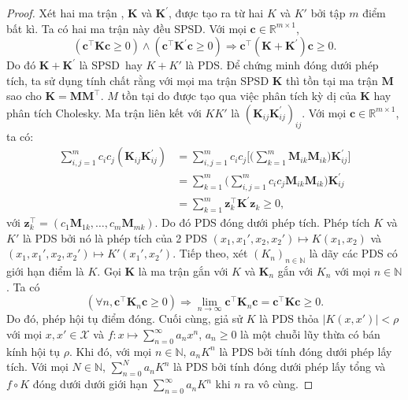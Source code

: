\begin{proof}
  Xét hai ma trận , $\mathbf{K}$ và $\mathbf{K}^\prime$, được tạo ra
  từ hai  $K$ và $K'$ bởi tập $m$ điểm bất kì. Ta có hai ma trận này
  đều SPSD. Với mọi $\mathbf{c} \in \mathbb{R}^{m\times 1}$, \begin{equation}
    (\mathbf{c}^\intercal \mathbf{K} \mathbf{c} \ge 0) \wedge
    (\mathbf{c}^\intercal \mathbf{K}^\prime \mathbf{c} \ge 0) \Rightarrow
    \mathbf{c}^\intercal(\mathbf{K} + \mathbf{K}^\prime) \mathbf{c} \ge 0.
  \end{equation} Do đó $\mathbf{K} + \mathbf{K}^\prime$ là SPSD hay $K + K'$ là
  PDS. Để chứng minh đóng dưới phép tích, ta sử dụng tính chất rằng với mọi ma
  trận SPSD $\mathbf{K}$ thì tồn tại ma trận $\mathbf{M}$ sao cho $\mathbf{K} =
  \mathbf{M}\mathbf{M}^\intercal$. $M$ tồn tại do được tạo qua việc phân tích
  kỳ dị của $\mathbf{K}$ hay phân tích Cholesky. Ma trận  liên kết
  với $KK'$ là $(\mathbf{K}_{ij}\mathbf{K}^\prime_{ij})_{ij}$. Với mọi
  $\mathbf{c} \in \mathbb{R}^{m\times 1}$, ta có: \begin{align}
    \sum_{i, j = 1}^m c_ic_j(\mathbf{K}_{ij}\mathbf{K}^\prime_{ij}) &= \sum_{i,
      j = 1}^m c_ic_j \Biggl[ \biggl(\sum_{k = 1}^m \mathbf{M}_{ik}
      \mathbf{M}_{ik}\biggr)\mathbf{K}^\prime_{ij} \Biggr] \\
    &= \sum_{k = 1}^m \biggl( \sum_{i, j = 1}^m c_ic_j \mathbf{M}_{ik}
      \mathbf{M}_{ik}) \mathbf{K}^\prime_{ij} \\
    &= \sum_{k = 1}^m \mathbf{z}_k^\intercal \mathbf{K}^\prime \mathbf{z}_k \ge
    0,
  \end{align} với $\mathbf{z}_k^\intercal = (c_1\mathbf{M}_{1k}, \dots,
  c_m\mathbf{M}_{mk})$. Do đó  PDS đóng dưới phép tích. Phép tích
   $K$ và $K'$ là PDS bởi nó là phép tích của 2  PDS
  $(x_1, x_1', x_2, x_2') \mapsto K(x_1, x_2)$ và $(x_1, x_1', x_2, x_2')
  \mapsto K'(x_1', x_2')$. Tiếp theo, xét $(K_n)_{n\in\mathbb{N}}$ là dãy các
   PDS có giới hạn điểm là $K$. Gọi $\mathbf{K}$ là ma trận
   gắn với $K$ và $\mathbf{K}_n$ gắn với $K_n$ với mọi
  $n\in\mathbb{N}$. Ta có \begin{equation}
    (\forall n, \mathbf{c}^\intercal \mathbf{K}_n \mathbf{c} \ge 0) \Rightarrow
    \lim_{n\to\infty} \mathbf{c}^\intercal \mathbf{K}_n \mathbf{c} =
    \mathbf{c}^\intercal \mathbf{K} \mathbf{c} \ge 0.
  \end{equation} Do đó, phép hội tụ điểm đóng. Cuối cùng, giả sử $K$ là
   PDS thỏa $\bigl\lvert K(x, x') \bigr\rvert < \rho$ với mọi $x, x'
  \in \mathcal{X}$ và $f\colon x\mapsto \sum_{n = 0}^\infty a_n x^n$, $a_n \ge
  0$ là một chuỗi lũy thừa có bán kính hội tụ $\rho$. Khi đó, với mọi $n\in
  \mathbb{N}$, $a_nK^n$ là PDS bởi tính đóng dưới phép lấy tích. Với mọi $N \in
  \mathbb{N}$, $\sum_{n = 0}^N a_nK^n$ là PDS bởi tính đóng dưới phép lấy tổng
  và $f\circ K$ đóng dưới dưới giới hạn $\sum_{n = 0}^\infty a_nK^n$ khi $n$ ra
  vô cùng.
\end{proof}

